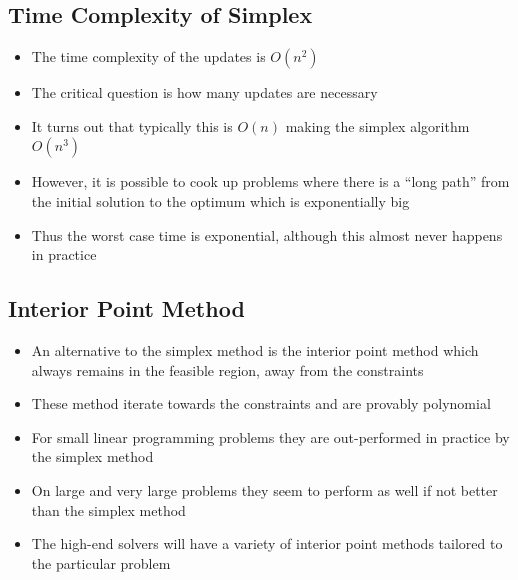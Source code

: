 
\begin{slide}
\section{Time Complexity of Simplex}

\begin{PauseHighLight}
  \begin{itemize}
  \item The time complexity of the updates is $O(n^2)$\pause
  \item The critical question is how many updates are necessary\pause
  \item It turns out that typically this is $O(n)$ making the simplex
    algorithm $O(n^3)$\pause
  \item However, it is possible to cook up problems where there is a
    ``long path'' from the initial solution to the optimum which is
    exponentially big\pause
  \item Thus the worst case time is exponential, although this almost
    never happens in practice\pause
  \end{itemize}
\end{PauseHighLight}

\end{slide}


\begin{slide}
\section[-2]{Interior Point Method}

\begin{PauseHighLight}
  \begin{itemize}
  \item An alternative to the simplex method is the interior point
    method which always remains in the feasible region, away from the
    constraints\pause
  \item These method iterate towards the constraints and are provably
    polynomial\pause
  \item For small linear programming problems they are out-performed in
    practice by the simplex method\pause
  \item On large and very large problems they seem to perform as well if
    not better than the simplex method\pause
  \item The high-end solvers will have a variety of interior point
    methods tailored to the particular problem\pause
  \end{itemize}
\end{PauseHighLight}

\end{slide}

